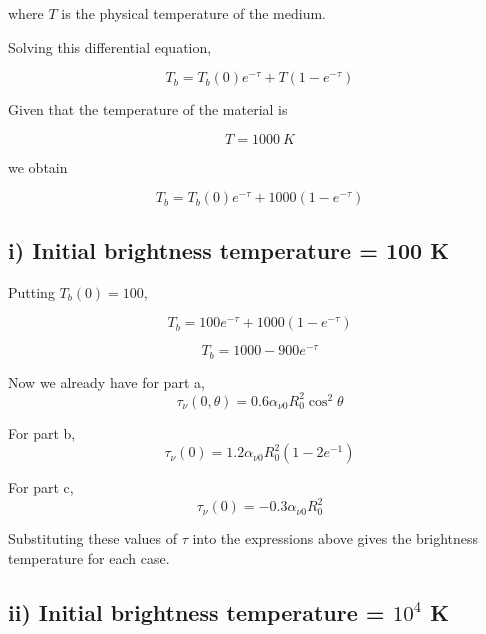 \documentclass{article}
\begin{document}
where $T$ is the physical temperature of the medium.

Solving this differential equation,

\begin{equation}
T_b = T_b(0)e^{-\tau} + T(1-e^{-\tau})
\end{equation}

Given that the temperature of the material is

\begin{equation}
T = 1000\ K
\end{equation}

we obtain

\begin{equation}
T_b = T_b(0)e^{-\tau} + 1000(1-e^{-\tau})
\end{equation}

\subsection{i) Initial brightness temperature = 100 K}

Putting $T_b(0)=100$,

\begin{equation}
T_b = 100 e^{-\tau} + 1000(1-e^{-\tau})
\end{equation}

\begin{equation}
\boxed{
T_b = 1000 - 900e^{-\tau}
}
\end{equation}

Now we already have for part a,
\begin{equation}
\tau_\nu(0,\theta)=0.6\alpha_{\nu0}R_0^2\cos^2\theta
\end{equation}


For part b,
\begin{equation}
\tau_\nu(0)=1.2\alpha_{\nu0}R_0^2(1-2e^{-1})
\end{equation}

For part c,
\begin{equation}
\tau_\nu(0)=-0.3\alpha_{\nu0}R_0^2
\end{equation}

Substituting these values of $\tau$ into the expressions above gives the brightness temperature for each case.

\subsection{ii) Initial brightness temperature = $10^4$ K}
\end{document}
